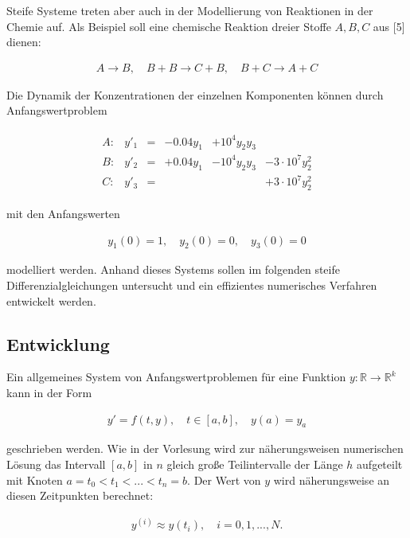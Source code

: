 \documentclass[
	pagesize,
	fontsize=12pt,
	paper=a4,
	oneside,
   reqno
]{scrartcl}
\begin{document}
Steife Systeme treten aber auch in der Modellierung von Reaktionen in der Chemie auf. Als Beispiel soll eine chemische Reaktion dreier Stoffe $A, B, C$ aus [5] dienen:

\begin{align*}
   A \rightarrow B, \quad B +B \rightarrow C + B, \quad B + C \rightarrow A + C
\end{align*}

Die Dynamik der Konzentrationen der einzelnen Komponenten können durch Anfangswertproblem

\begin{align}
   \label{eq:eq9}
   \begin{matrix*}
      A: & y'_1 & = & -0.04y_1   & +10^4y_2y_3                       \\
      B: & y'_2 & = & +0.04y_1   & -10^4y_2y_3  & -3 \cdot 10^7y_2^2 \\
      C: & y'_3 & = &            &              & +3 \cdot 10^7y_2^2
   \end{matrix*}
\end{align}

mit den Anfangswerten

\begin{align}
   y_1(0) = 1, \quad y_2(0) = 0, \quad y_3(0) = 0
\end{align}

modelliert werden. Anhand dieses Systems sollen im folgenden steife Differenzialgleichungen untersucht und ein effizientes numerisches Verfahren entwickelt werden.

\subsection{Entwicklung}

Ein allgemeines System von Anfangswertproblemen für eine Funktion $y : \mathbb{R} \to \mathbb{R} ^k$ kann in der Form

\begin{align}
   \label{eq:eq11}
   y' = f(t,y), \quad t \in [a,b], \quad y(a) = y_a
\end{align}

geschrieben werden. Wie in der Vorlesung wird zur näherungsweisen numerischen Lösung das Intervall $[a,b]$ in $n$ gleich große Teilintervalle der Länge $h$ aufgeteilt mit Knoten $a = t_0 < t_1 < ... < t_n = b$. Der Wert von $y$ wird näherungsweise an diesen Zeitpunkten berechnet:

\begin{align*}
   y^{(i)} \approx y(t_i), \quad i = 0, 1, ..., N.
\end{align*}
\end{document}
